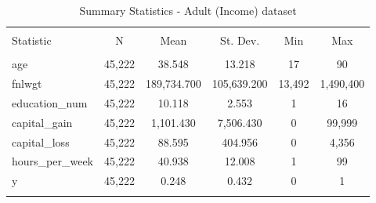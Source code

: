 
\begin{table}[ht] \centering 
  \caption{Summary Statistics - Adult (Income) dataset} 
  \label{tbl:summary_stats_50k} 
\begin{tabular}{@{\extracolsep{5pt}}lccccc} 
\\[-1.8ex]\hline 
\hline \\[-1.8ex] 
Statistic & \multicolumn{1}{c}{N} & \multicolumn{1}{c}{Mean} & \multicolumn{1}{c}{St. Dev.} & \multicolumn{1}{c}{Min} & \multicolumn{1}{c}{Max} \\ 
\hline \\[-1.8ex] 
age & 45,222 & 38.548 & 13.218 & 17 & 90 \\ 
fnlwgt & 45,222 & 189,734.700 & 105,639.200 & 13,492 & 1,490,400 \\ 
education\_num & 45,222 & 10.118 & 2.553 & 1 & 16 \\ 
capital\_gain & 45,222 & 1,101.430 & 7,506.430 & 0 & 99,999 \\ 
capital\_loss & 45,222 & 88.595 & 404.956 & 0 & 4,356 \\ 
hours\_per\_week & 45,222 & 40.938 & 12.008 & 1 & 99 \\ 
y & 45,222 & 0.248 & 0.432 & 0 & 1 \\ 
\hline \\[-1.8ex] 
\end{tabular} 
\end{table} 
